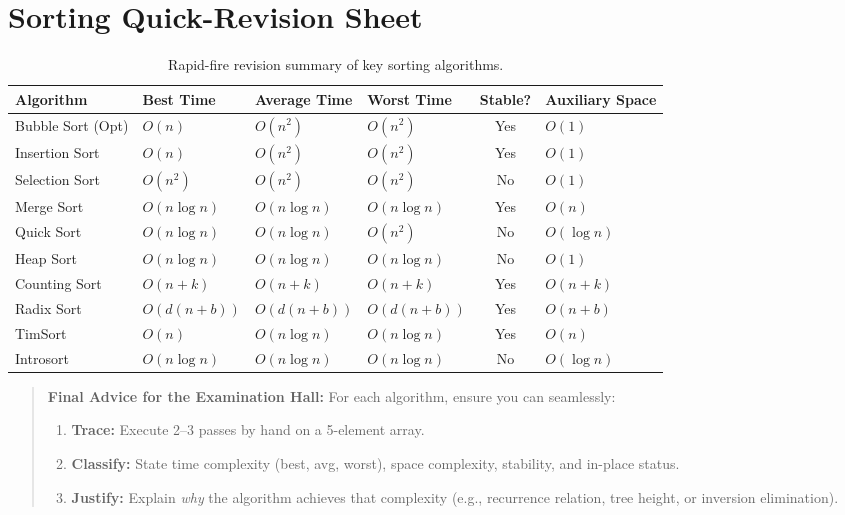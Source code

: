\section{Sorting Quick-Revision Sheet}

\begin{table}[htbp]
\centering
\small
\begin{tabularx}{\textwidth}{p{3.5cm} p{2cm} p{2cm} p{2cm} c X}
\toprule
\textbf{Algorithm} & \textbf{Best Time} & \textbf{Average Time} & \textbf{Worst Time} & \textbf{Stable?} & \textbf{Auxiliary Space} \\
\midrule
Bubble Sort (Opt)  & $O(n)$ & $O(n^2)$ & $O(n^2)$ & Yes & $O(1)$ \\
Insertion Sort     & $O(n)$ & $O(n^2)$ & $O(n^2)$ & Yes & $O(1)$ \\
Selection Sort     & $O(n^2)$ & $O(n^2)$ & $O(n^2)$ & No  & $O(1)$ \\
Merge Sort         & $O(n \log n)$ & $O(n \log n)$ & $O(n \log n)$ & Yes & $O(n)$ \\
Quick Sort         & $O(n \log n)$ & $O(n \log n)$ & $O(n^2)$ & No  & $O(\log n)$ \\
Heap Sort          & $O(n \log n)$ & $O(n \log n)$ & $O(n \log n)$ & No  & $O(1)$ \\
Counting Sort      & $O(n + k)$ & $O(n + k)$ & $O(n + k)$ & Yes & $O(n + k)$ \\
Radix Sort         & $O(d(n + b))$ & $O(d(n + b))$ & $O(d(n + b))$ & Yes & $O(n + b)$ \\
TimSort            & $O(n)$ & $O(n \log n)$ & $O(n \log n)$ & Yes & $O(n)$ \\
Introsort          & $O(n \log n)$ & $O(n \log n)$ & $O(n \log n)$ & No  & $O(\log n)$ \\
\bottomrule
\end{tabularx}
\caption{Rapid-fire revision summary of key sorting algorithms.}
\end{table}

\begin{quote}
\textbf{Final Advice for the Examination Hall:} For each algorithm, ensure you can seamlessly:
\begin{enumerate}
    \item \textbf{Trace:} Execute 2--3 passes by hand on a 5-element array.
    \item \textbf{Classify:} State time complexity (best, avg, worst), space complexity, stability, and in-place status.
    \item \textbf{Justify:} Explain \textit{why} the algorithm achieves that complexity (e.g., recurrence relation, tree height, or inversion elimination).
\end{enumerate}
\end{quote}


